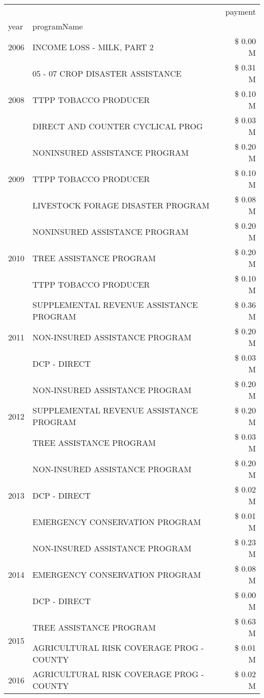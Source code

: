\begin{tabular}{llr}
\toprule
 &  & payment \\
year & programName &  \\
\midrule
2006 & INCOME LOSS - MILK, PART 2 & \$ 0.00 M \\
\cline{1-3}
\multirow[t]{3}{*}{2008} & 05 - 07 CROP DISASTER ASSISTANCE & \$ 0.31 M \\
 & TTPP TOBACCO PRODUCER & \$ 0.10 M \\
 & DIRECT AND COUNTER CYCLICAL PROG & \$ 0.03 M \\
\cline{1-3}
\multirow[t]{3}{*}{2009} & NONINSURED ASSISTANCE PROGRAM & \$ 0.20 M \\
 & TTPP TOBACCO PRODUCER & \$ 0.10 M \\
 & LIVESTOCK FORAGE DISASTER  PROGRAM & \$ 0.08 M \\
\cline{1-3}
\multirow[t]{3}{*}{2010} & NONINSURED ASSISTANCE PROGRAM & \$ 0.20 M \\
 & TREE ASSISTANCE PROGRAM & \$ 0.20 M \\
 & TTPP TOBACCO PRODUCER & \$ 0.10 M \\
\cline{1-3}
\multirow[t]{3}{*}{2011} & SUPPLEMENTAL REVENUE ASSISTANCE PROGRAM & \$ 0.36 M \\
 & NON-INSURED ASSISTANCE PROGRAM & \$ 0.20 M \\
 & DCP - DIRECT & \$ 0.03 M \\
\cline{1-3}
\multirow[t]{3}{*}{2012} & NON-INSURED ASSISTANCE PROGRAM & \$ 0.20 M \\
 & SUPPLEMENTAL REVENUE ASSISTANCE PROGRAM & \$ 0.20 M \\
 & TREE ASSISTANCE PROGRAM & \$ 0.03 M \\
\cline{1-3}
\multirow[t]{3}{*}{2013} & NON-INSURED ASSISTANCE PROGRAM & \$ 0.20 M \\
 & DCP - DIRECT & \$ 0.02 M \\
 & EMERGENCY CONSERVATION PROGRAM & \$ 0.01 M \\
\cline{1-3}
\multirow[t]{3}{*}{2014} & NON-INSURED ASSISTANCE PROGRAM & \$ 0.23 M \\
 & EMERGENCY CONSERVATION PROGRAM & \$ 0.08 M \\
 & DCP - DIRECT & \$ 0.00 M \\
\cline{1-3}
\multirow[t]{2}{*}{2015} & TREE ASSISTANCE PROGRAM & \$ 0.63 M \\
 & AGRICULTURAL RISK COVERAGE PROG - COUNTY & \$ 0.01 M \\
\cline{1-3}
\multirow[t]{3}{*}{2016} & AGRICULTURAL RISK COVERAGE PROG - COUNTY & \$ 0.02 M \\

\end{tabular}
